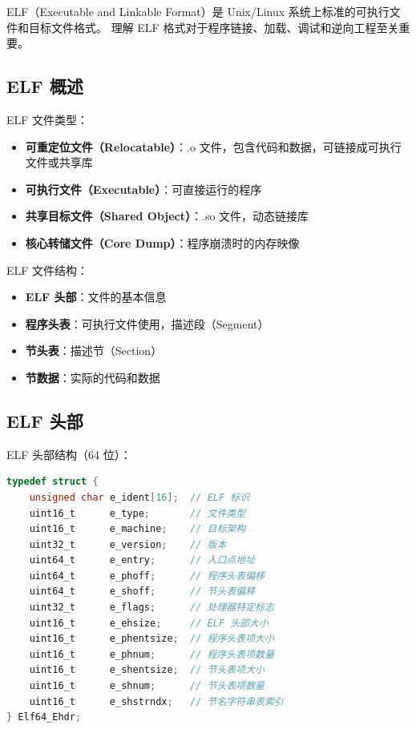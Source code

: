 ELF（Executable and Linkable Format）是 Unix/Linux 系统上标准的可执行文件和目标文件格式。
理解 ELF 格式对于程序链接、加载、调试和逆向工程至关重要。

\subsection{ELF 概述}


ELF 文件类型：
\begin{itemize}
  \item \textbf{可重定位文件（Relocatable）}：.o 文件，包含代码和数据，可链接成可执行文件或共享库
  \item \textbf{可执行文件（Executable）}：可直接运行的程序
  \item \textbf{共享目标文件（Shared Object）}：.so 文件，动态链接库
  \item \textbf{核心转储文件（Core Dump）}：程序崩溃时的内存映像
\end{itemize}

ELF 文件结构：
\begin{itemize}
  \item \textbf{ELF 头部}：文件的基本信息
  \item \textbf{程序头表}：可执行文件使用，描述段（Segment）
  \item \textbf{节头表}：描述节（Section）
  \item \textbf{节数据}：实际的代码和数据
\end{itemize}

\subsection{ELF 头部}


ELF 头部结构（64 位）：
\begin{lstlisting}[language=C]
typedef struct {
    unsigned char e_ident[16];  // ELF 标识
    uint16_t      e_type;       // 文件类型
    uint16_t      e_machine;    // 目标架构
    uint32_t      e_version;    // 版本
    uint64_t      e_entry;      // 入口点地址
    uint64_t      e_phoff;      // 程序头表偏移
    uint64_t      e_shoff;      // 节头表偏移
    uint32_t      e_flags;      // 处理器特定标志
    uint16_t      e_ehsize;     // ELF 头部大小
    uint16_t      e_phentsize;  // 程序头表项大小
    uint16_t      e_phnum;      // 程序头表项数量
    uint16_t      e_shentsize;  // 节头表项大小
    uint16_t      e_shnum;      // 节头表项数量
    uint16_t      e_shstrndx;   // 节名字符串表索引
} Elf64_Ehdr;
\end{lstlisting}

